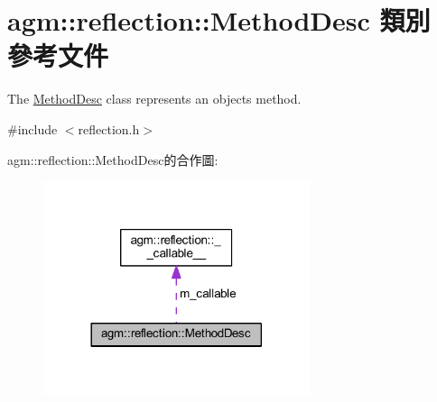 \hypertarget{classagm_1_1reflection_1_1_method_desc}{}\section{agm\+:\+:reflection\+:\+:Method\+Desc 類別 參考文件}
\label{classagm_1_1reflection_1_1_method_desc}


The \hyperlink{classagm_1_1reflection_1_1_method_desc}{Method\+Desc} class represents an object\textquotesingle{}s method.  




{\ttfamily \#include $<$reflection.\+h$>$}



agm\+:\+:reflection\+:\+:Method\+Desc的合作圖\+:\nopagebreak
\begin{figure}[H]
\begin{center}
\leavevmode
\includegraphics[width=221pt]{classagm_1_1reflection_1_1_method_desc__coll__graph}
\end{center}
\end{figure}
